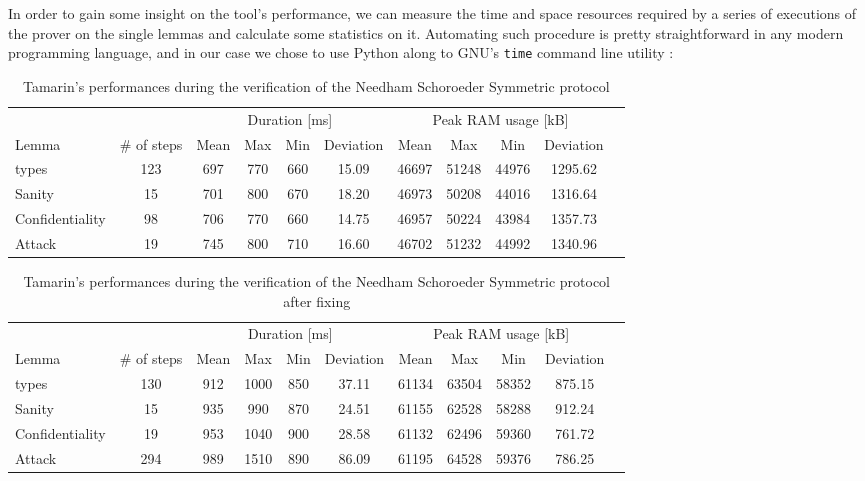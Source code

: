 \documentclass[fleqn,10pt]{SelfArx} %
\begin{document}
In order to gain some insight on the tool's performance, we can measure the time and space resources required by a series of executions of the prover on the single lemmas and calculate some statistics on it. Automating such procedure is pretty straightforward in any modern programming language, and in our case we chose to use Python along to GNU's \lstinline|time| command line utility \cite{GNUtime}:

\begin{table}[t]
    \centering
    \begin{tabularx}{0.85\textwidth}{@{}lcccccccccc@{}}
        \toprule
        \multicolumn{1}{c}{} & \multicolumn{1}{c}{} & \multicolumn{4}{c}{Duration [ms]} & \multicolumn{4}{c}{Peak RAM usage [kB]}\\
        \cmidrule(rl){3-6} \cmidrule(rl){7-10}
        Lemma & \# of steps & Mean & Max & Min & Deviation & Mean & Max & Min & Deviation \\
        \midrule
        types & 123 & 697 & 770 & 660 & 15.09 & 46697 & 51248 & 44976 & 1295.62\\
        \addlinespace
        Sanity & 15 & 701 & 800 & 670 & 18.20 & 46973 & 50208 & 44016 & 1316.64\\
        \addlinespace
        Confidentiality & 98 & 706 & 770 & 660 & 14.75 & 46957 & 50224 & 43984 & 1357.73\\
        \addlinespace
        Attack & 19 & 745 & 800 & 710 & 16.60 & 46702 & 51232 & 44992 & 1340.96\\
        \bottomrule
        \end{tabularx}
    \caption{Tamarin's performances during the verification of the Needham Schoroeder Symmetric protocol}
    \label{tab:tableNS}
\end{table}

\begin{table}[t]
    \centering
    \begin{tabularx}{0.85\textwidth}{@{}lcccccccccc@{}}
        \toprule
        \multicolumn{1}{c}{} & \multicolumn{1}{c}{} & \multicolumn{4}{c}{Duration [ms]} & \multicolumn{4}{c}{Peak RAM usage [kB]}\\
        \cmidrule(rl){3-6} \cmidrule(rl){7-10}
        Lemma & \# of steps & Mean & Max & Min & Deviation & Mean & Max & Min & Deviation \\
        \midrule
        types & 130 & 912 & 1000 & 850 & 37.11 & 61134 & 63504 & 58352 & 875.15\\
        \addlinespace
        Sanity & 15 & 935 & 990 & 870 & 24.51 & 61155 & 62528 & 58288 & 912.24\\
        \addlinespace
        Confidentiality & 19 & 953 & 1040 & 900 & 28.58 & 61132 & 62496 & 59360 & 761.72\\
        \addlinespace
        Attack & 294 & 989 & 1510 & 890 & 86.09 & 61195 & 64528 & 59376 & 786.25\\
        \bottomrule
        \end{tabularx}
    \caption{Tamarin's performances during the verification of the Needham Schoroeder Symmetric protocol after fixing}
    \label{tab:tableNSFixed}
\end{table}
\end{document}
